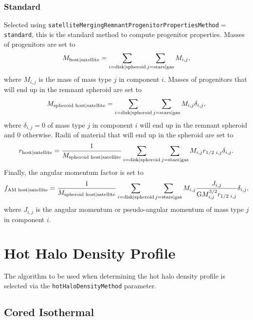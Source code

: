 \subsubsection{Standard}

Selected using {\tt satelliteMergingRemnantProgenitorPropertiesMethod}$=${\tt standard}, this is the standard method to compute progenitor properties. Masses of progenitors are set to
\begin{equation}
 M_{\rm host|satellite} = \sum_{i={\rm disk|spheroid}} \sum_{j={\rm stars|gas}} M_{i,j},
\end{equation}
where $M_{i,j}$ is the mass of mass type $j$ in \gls{component} $i$. Masses of progenitors that will end up in the remnant spheroid are set to
\begin{equation}
 M_{\rm spheroid\,\,host|satellite} = \sum_{i={\rm disk|spheroid}} \sum_{j={\rm stars|gas}} M_{i,j} \delta_{i,j},
\end{equation}
where $\delta_{i,j}=0$ of mass type $j$ in \gls{component} $i$ will end up in the remnant spheroid and $0$ otherwise. Radii of material that will end up in the spheroid are set to
\begin{equation}
 r_{\rm host|satellite} = {1 \over M_{\rm spheroid\,\,host|satellite}} \sum_{i={\rm disk|spheroid}} \sum_{j={\rm stars|gas}} M_{i,j} r_{1/2\,\,i,j} \delta_{i,j}.
\end{equation}
Finally, the angular momentum factor is set to
\begin{equation}
 f_{\rm AM\,\,host|satellite} = {1 \over M_{\rm spheroid\,\,host|satellite}} \sum_{i={\rm disk|spheroid}} \sum_{j={\rm stars|gas}} M_{i,j} {J_{i,j} \over {\rm G} M^{3/2}_{i,j} r_{1/2\,\,i,j}} \delta_{i,j},
\end{equation}
where $J_{i,j}$ is the angular momentum or pseudo-angular momentum of mass type $j$ in \gls{component} $i$.

\section{Hot Halo Density Profile}

The algorithm to be used when determining the hot halo density profile is selected via the {\tt hotHaloDensityMethod} parameter.

\subsection{Cored Isothermal}

